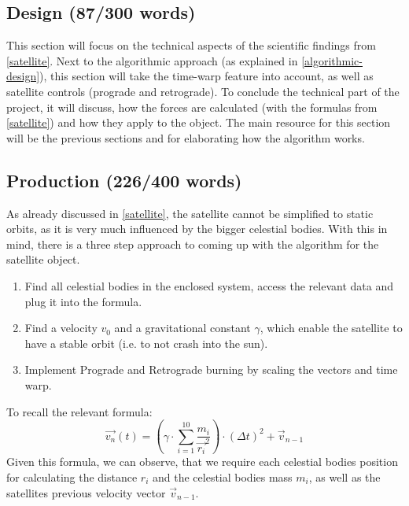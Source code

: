 \documentclass[conference,compsoc]{IEEEtran}
\begin{document}
\subsection{Design (87/300 words)}
This section will focus on the technical aspects of the scientific findings from \ref{satellite}. Next to the algorithmic approach (as explained in \ref{algorithmic-design}), this section will take the time-warp feature into account, as well as satellite controls (prograde and retrograde). To conclude the technical part of the project, it will discuss, how the forces are calculated (with the formulas from \ref{satellite}) and how they apply to the object. The main resource for this section will be the previous sections and \cite{UnityDoc} for elaborating how the algorithm works.
\subsection{Production (226/400 words)}
As already discussed in \ref{satellite}, the satellite cannot be simplified to static orbits, as it is very much influenced by the bigger celestial bodies. With this in mind, there is a three step approach to coming up with the algorithm for the satellite object.
\begin{enumerate}
	\item Find all celestial bodies in the enclosed system, access the relevant data and plug it into the formula.
	\item Find a velocity $v_{0}$ and a gravitational constant $\gamma$, which enable the satellite to have a stable orbit (i.e. to not crash into the sun).
	\item Implement Prograde and Retrograde burning by scaling the vectors and time warp.
\end{enumerate}
To recall the relevant formula: 
$$ \vec{v_{n}}(t) = (\gamma \cdot \sum_{i=1}^{10}{\frac{m_{i}}{\vec{r_{i}}^{2}}}) \cdot (\Delta t)^{2} + \vec{v}_{n-1} $$
Given this formula, we can observe, that we require each celestial bodies position for calculating the distance $r_{i}$ and the celestial bodies mass $m_{i}$, as well as the satellites previous velocity vector $\vec{v}_{n-1}$.
\end{document}

